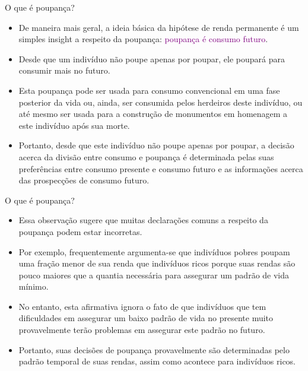 \documentclass[10pt]{beamer}
\begin{document}
\begin{frame}{O que é poupança?}
    \begin{itemize}
        \item De maneira mais geral, a ideia básica da hipótese de renda permanente é um simples insight a respeito da poupança: \textcolor{purple}{poupança é consumo futuro}.
        \bigskip
        \item Desde que um indivíduo não poupe apenas por poupar, ele poupará para consumir mais no futuro.
        \bigskip
        \item Esta poupança pode ser usada para consumo convencional em uma fase posterior da vida ou, ainda, ser consumida pelos herdeiros deste indivíduo, ou até mesmo ser usada para a construção de monumentos em homenagem a este indivíduo após sua morte.
        \bigskip
        \item Portanto, desde que este indivíduo não poupe apenas por poupar, a decisão acerca da divisão entre consumo e poupança é determinada pelas suas preferências entre consumo presente e consumo futuro e as informações acerca das prospecções de consumo futuro.
    \end{itemize}
\end{frame}

\begin{frame}{O que é poupança?}
    \begin{itemize}
        \item Essa observação sugere que muitas declarações comuns a respeito da poupança podem estar incorretas.
        \bigskip
        \item Por exemplo, frequentemente argumenta-se que indivíduos pobres poupam uma fração menor de sua renda que indivíduos ricos porque suas rendas são pouco maiores que a quantia necessária para assegurar um padrão de vida mínimo.
        \bigskip
        \item No entanto, esta afirmativa ignora o fato de que indivíduos que tem dificuldades em assegurar um baixo padrão de vida no presente muito provavelmente terão problemas em assegurar este padrão no futuro.
        \bigskip
        \item Portanto, suas decisões de poupança provavelmente são determinadas pelo padrão temporal de suas rendas, assim como acontece para indivíduos ricos.
    \end{itemize}
\end{frame}
\end{document}
